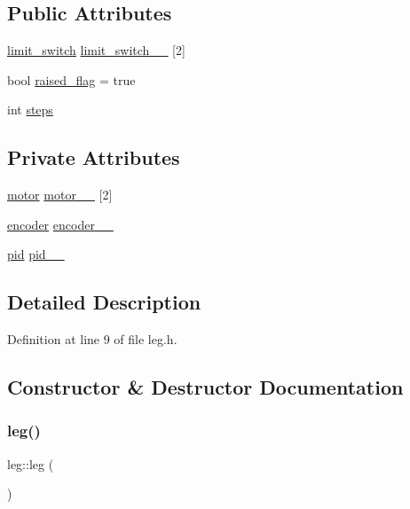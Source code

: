 \subsection*{Public Attributes}
\begin{DoxyCompactItemize}
\item 
\mbox{\hyperlink{structlimit__switch}{limit\+\_\+switch}} \mbox{\hyperlink{classleg_a3c984e90c4004c8dae1e2723fc7eaf52}{limit\+\_\+switch\+\_\+\+\_\+}} \mbox{[}2\mbox{]}
\item 
bool \mbox{\hyperlink{classleg_a372d20db7e4927fdd9f7e7a7a35120d9}{raised\+\_\+flag}} = true
\item 
int \mbox{\hyperlink{classleg_a8056ae3fb3e8df59e560316932a2be0d}{steps}}
\end{DoxyCompactItemize}
\subsection*{Private Attributes}
\begin{DoxyCompactItemize}
\item 
\mbox{\hyperlink{classmotor}{motor}} \mbox{\hyperlink{classleg_a2058f7ac334deed6758768bbe44191b8}{motor\+\_\+\+\_\+}} \mbox{[}2\mbox{]}
\item 
\mbox{\hyperlink{classencoder}{encoder}} \mbox{\hyperlink{classleg_af6548dbf60a17b49bb4e1da05d0fa933}{encoder\+\_\+\+\_\+}}
\item 
\mbox{\hyperlink{classpid}{pid}} \mbox{\hyperlink{classleg_aec2df9c9b7e4952666c6a8dfc5c23fb1}{pid\+\_\+\+\_\+}}
\end{DoxyCompactItemize}


\subsection{Detailed Description}


Definition at line 9 of file leg.\+h.



\subsection{Constructor \& Destructor Documentation}
\mbox{\label{classleg_a418877dece641560d83d01fa236ec8a4}} 
\subsubsection{\texorpdfstring{leg()}{leg()}\hspace{0.1cm}{\footnotesize\ttfamily [1/3]}}
{\footnotesize\ttfamily leg\+::leg (\begin{DoxyParamCaption}{ }\end{DoxyParamCaption})\hspace{0.3cm}{\ttfamily [inline]}}



